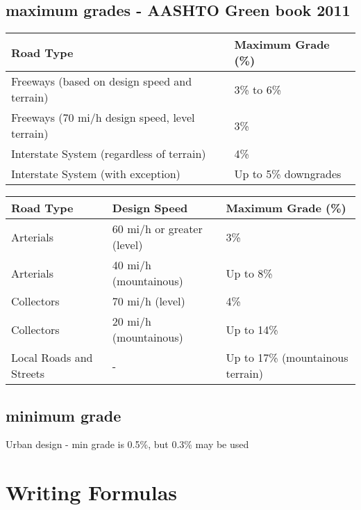 \documentclass{article}   %
\begin{document}
  \subsection{maximum grades - AASHTO Green book 2011}

  \vspace{1cm} %
  \begin{center}
  \begin{tabular}{l l}
    \textbf{Road Type} & \textbf{Maximum Grade (\%)} \\
    \hline
    Freeways (based on design speed and terrain) & 3\% to 6\% \\
    Freeways (70 mi/h design speed, level terrain) & 3\% \\
    Interstate System (regardless of terrain) & 4\% \\
    Interstate System (with exception) & Up to 5\% downgrades \\
  \end{tabular}
  \end{center}

  \vspace{1cm} %
  \begin{center}
  \begin{tabular}{l l l}
    \textbf{Road Type} & \textbf{Design Speed} & \textbf{Maximum Grade (\%)} \\
    \hline
    Arterials & 60 mi/h or greater (level) & 3\% \\
    Arterials & 40 mi/h (mountainous) & Up to 8\% \\
    Collectors & 70 mi/h (level) & 4\% \\
    Collectors & 20 mi/h (mountainous) & Up to 14\% \\
    Local Roads and Streets & - & Up to 17\% (mountainous terrain) \\
  \end{tabular}
  \end{center}

  \subsection{minimum grade}
  Urban design - min grade is 0.5\%, but 0.3\% may be used

  \newpage


  \section{Writing Formulas}
\end{document}
